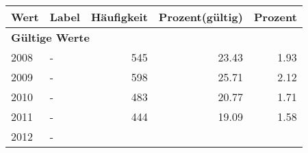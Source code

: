      \begin{longtable}{lXrrr}
     \toprule
     \textbf{Wert} & \textbf{Label} & \textbf{Häufigkeit} & \textbf{Prozent(gültig)} & \textbf{Prozent} \\
     \endhead
     \midrule
     \multicolumn{5}{l}{\textbf{Gültige Werte}}\\

     2008 &
     \multicolumn{1}{X}{ -  } &


       \num{545} &
       \num[round-mode=places,round-precision=2]{23,43} &
         \num[round-mode=places,round-precision=2]{1,93} \\

     2009 &
     \multicolumn{1}{X}{ -  } &


       \num{598} &
       \num[round-mode=places,round-precision=2]{25,71} &
         \num[round-mode=places,round-precision=2]{2,12} \\

     2010 &
     \multicolumn{1}{X}{ -  } &


       \num{483} &
       \num[round-mode=places,round-precision=2]{20,77} &
         \num[round-mode=places,round-precision=2]{1,71} \\

     2011 &
     \multicolumn{1}{X}{ -  } &


       \num{444} &
       \num[round-mode=places,round-precision=2]{19,09} &
         \num[round-mode=places,round-precision=2]{1,58} \\

     2012 &
     \multicolumn{1}{X}{ -  } &



\end{longtable}
